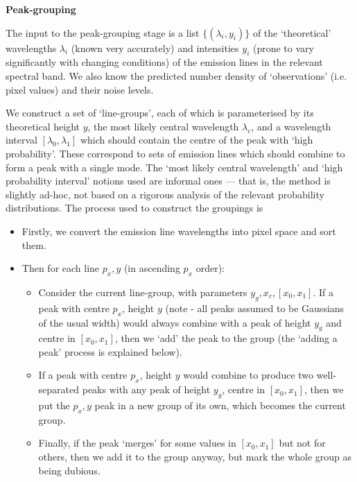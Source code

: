 \vspace{1em}

{\bf{Peak-grouping}}

\vspace{1em}

The input to the peak-grouping stage is a list $\{(\lambda_i, y_i)\}$ of
the `theoretical' wavelengths $\lambda_i$ (known very accurately) and intensities
$y_i$ (prone to vary significantly with changing conditions) of the emission
lines in the relevant spectral band. We also know the predicted number
density of `observations' (i.e. pixel values) and their noise levels.

We construct a set of `line-groups', each of which is parameterised
by its theoretical height $y$, the most likely central wavelength
$\lambda_c$, and a wavelength interval $[\lambda_0, \lambda_1]$ which
should contain the centre of the peak with `high probability'. These
correspond to sets of emission lines which should combine to form a
peak with a single mode. The `most likely central wavelength' and `high
probability interval' notions used are informal ones --- that is, the
method is slightly ad-hoc, not based on a rigorous analysis of the
relevant probability distributions. The process used to construct the
groupings is
%
\begin{itemize}
\item Firstly, we convert the emission line wavelengths into pixel space
and sort them.
\item Then for each line $p_x, y$ (in ascending $p_x$ order):
\begin{itemize}
\item Consider the current line-group, with parameters $y_g, x_c, [x_0,
x_1]$. If a peak with centre $p_x$, height $y$ (note - all peaks assumed
to be Gaussians of the usual width) would always combine with a peak of height
$y_g$ and centre in $[x_0, x_1]$, then we `add' the peak to the group
(the `adding a peak' process is explained below). 
\item If a peak with centre $p_x$, height $y$ would combine to produce
two well-separated peaks with any peak of height $y_g$, centre in $[x_0,
x_1]$, then we put the $p_x, y$ peak in a new group of its own, which
becomes the current group.
\item Finally, if the peak `merges' for some values in $[x_0, x_1]$ but not for
others, then we add it to the group anyway, but mark the whole group as being
dubious.
\end{itemize}
\end{itemize} 

